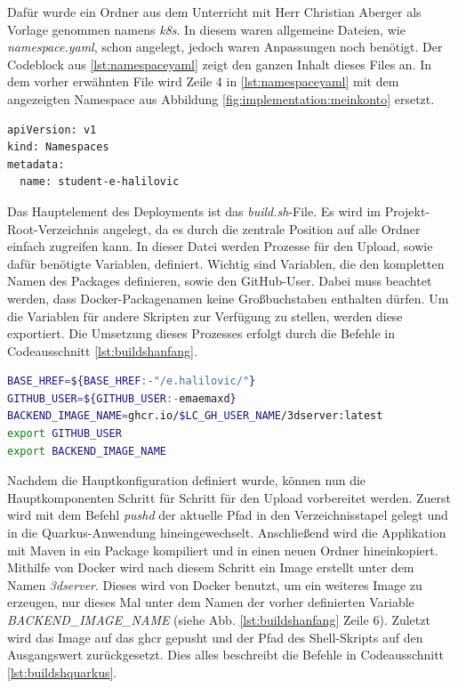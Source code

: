 Dafür wurde ein Ordner aus dem Unterricht mit Herr Christian Aberger als Vorlage genommen namens \emph{k8s}. 
In diesem waren allgemeine Dateien, wie \emph{namespace.yaml}, schon angelegt, jedoch waren Anpassungen noch benötigt. 
Der Codeblock aus \ref{lst:namespaceyaml} zeigt den ganzen Inhalt dieses Files an. 
In dem vorher erwähnten File wird Zeile 4 in \ref{lst:namespaceyaml} mit dem angezeigten Namespace aus Abbildung \ref{fig:implementation:meinkonto} ersetzt. 
\begin{lstlisting}[label=lst:namespaceyaml, language=bash, caption=Namespace konfiguration in namespace.yaml]
apiVersion: v1
kind: Namespaces
metadata:
  name: student-e-halilovic
\end{lstlisting}

Das Hauptelement des Deployments ist das \emph{build.sh}-File. 
Es wird im Projekt-Root-Verzeichnis angelegt, da es durch die zentrale Position auf alle Ordner einfach zugreifen kann. 
In dieser Datei werden Prozesse für den Upload, sowie dafür benötigte Variablen, definiert. 
Wichtig sind Variablen, die den kompletten Namen des Packages definieren, sowie den GitHub-User. 
Dabei muss beachtet werden, dass Docker-Packagenamen keine Großbuchstaben enthalten dürfen. 
Um die Variablen für andere Skripten zur Verfügung zu stellen, werden diese exportiert. 
Die Umsetzung dieses Prozesses erfolgt durch die Befehle in Codeausschnitt \ref{lst:buildshanfang}.

\begin{lstlisting}[label=lst:buildshanfang, language=bash, caption=Anfang der build.sh-Datei]
BASE_HREF=${BASE_HREF:-"/e.halilovic/"}
GITHUB_USER=${GITHUB_USER:-emaemaxd}
BACKEND_IMAGE_NAME=ghcr.io/$LC_GH_USER_NAME/3dserver:latest
export GITHUB_USER
export BACKEND_IMAGE_NAME
\end{lstlisting}    

Nachdem die Hauptkonfiguration definiert wurde, können nun die Hauptkomponenten Schritt für Schritt für den Upload vorbereitet werden. 
Zuerst wird mit dem Befehl \emph{pushd} der aktuelle Pfad in den Verzeichnisstapel gelegt und in die Quarkus-Anwendung hineingewechselt. 
Anschließend wird die Applikation mit Maven in ein Package kompiliert und in einen neuen Ordner hineinkopiert. 
Mithilfe von Docker wird nach diesem Schritt ein Image erstellt unter dem Namen \emph{3dserver}. 
Dieses wird von Docker benutzt, um ein weiteres Image zu erzeugen, nur dieses Mal unter dem Namen der vorher definierten Variable \emph{BACKEND\_IMAGE\_NAME} (siehe Abb. \ref{lst:buildshanfang} Zeile 6). 
Zuletzt wird das Image auf das \gls{ghcr} gepusht und der Pfad des Shell-Skripts auf den Ausgangswert zurückgesetzt. 
Dies alles beschreibt die Befehle in Codeausschnitt \ref{lst:buildshquarkus}.

